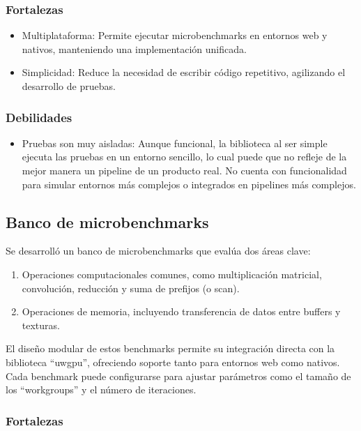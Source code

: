 \documentclass[conference]{IEEEtran}
\begin{document}
\subsubsection{Fortalezas}
\begin{itemize}
	\item Multiplataforma: Permite ejecutar microbenchmarks en entornos web y nativos, manteniendo una implementación unificada.
	\item Simplicidad: Reduce la necesidad de escribir código repetitivo, agilizando el desarrollo de pruebas.
\end{itemize}

\subsubsection{Debilidades}
\begin{itemize}
  \item Pruebas son muy aisladas: Aunque funcional, la biblioteca al ser simple
    ejecuta las pruebas en un entorno sencillo, lo cual puede que no refleje de
    la mejor manera un pipeline de un producto real. No cuenta con
    funcionalidad para simular entornos más complejos o integrados en pipelines
    más complejos.
\end{itemize}

\subsection{Banco de microbenchmarks}

Se desarrolló un banco de microbenchmarks que evalúa dos áreas clave:
\begin{enumerate}
\item Operaciones computacionales comunes, como multiplicación matricial,
  convolución, reducción y suma de prefijos (o scan).
\item Operaciones de memoria, incluyendo transferencia de datos entre buffers y
  texturas.
\end{enumerate}

El diseño modular de estos benchmarks permite su integración directa con la
biblioteca “uwgpu”, ofreciendo soporte tanto para entornos web como nativos.
Cada benchmark puede configurarse para ajustar parámetros como el tamaño de los
“workgroups” y el número de iteraciones.

\subsubsection{Fortalezas}
\end{document}
